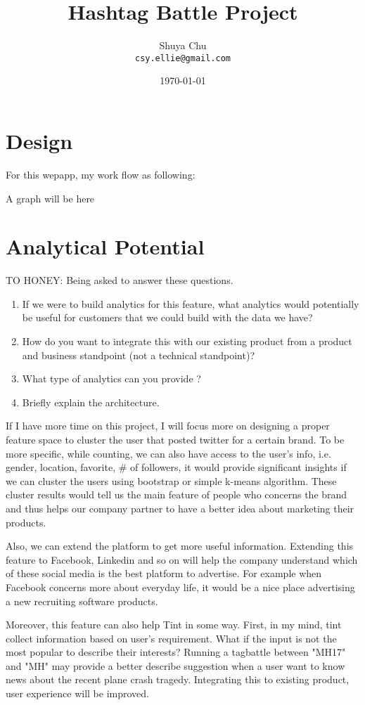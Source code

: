 \documentclass[11pt,letterpaper]{article}
\title{Hashtag Battle Project}
\author{Shuya Chu\\
  {\tt csy.ellie@gmail.com}
}
\date{\today}
\begin{document}
\maketitle


\section{Design}

For this wepapp, my work flow as following:

A graph will be here


\section{Analytical Potential}
TO HONEY:
Being asked to answer these questions. 
\begin{enumerate}
\item 
If we were to build analytics for this feature, what analytics would potentially be useful for customers that we could build with the data we have?
\item
 How do you want to integrate this with our existing product from a product and business standpoint (not a technical standpoint)?  
\item
 What type of analytics can you provide ?
\item
 Briefly explain the architecture.

\end{enumerate}


If I have more time on this project, I will focus more on designing a proper feature space to cluster the user that posted twitter for a certain brand. To be more specific, while counting, we can also have access to the user's info, i.e. gender, location, favorite, \# of followers, it would provide significant insights if we can cluster the users using bootstrap or simple k-means algorithm. These cluster results would tell us the main feature of people who concerns the brand and thus helps our company partner to have a better idea about marketing their products. 

Also, we can extend the platform to get more useful information. Extending this feature to Facebook, Linkedin and so on will help the company understand which of these social media is the best platform to advertise. For example when Facebook concerns more about everyday life, it would be a nice place advertising a new recruiting software products.

Moreover, this feature can also help Tint in some way. 
First, in my mind, tint collect information based on user's requirement. What if the input is not the most popular to describe their interests? Running a tagbattle between "MH17" and "MH" may provide a better describe suggestion when a user want to know news about the recent plane crash tragedy. Integrating this to existing product, user experience will be improved. 
\end{document}
